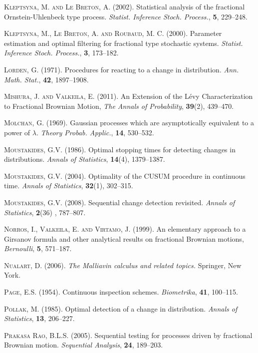 \documentclass[11pt,reqno]{amsart}
\theoremstyle{remark}
\begin{document}
\begin{thebibliography}{99}
 \textsc{Kleptsyna, M. and Le Breton, A.} (2002). Statistical analysis of the fractional Ornstein-Uhlenbeck type process. {\em Statist. Inference Stoch. Process.}, \textbf{5}, 229--248.

 \textsc{Kleptsyna, M., Le Breton, A. and Roubaud, M. C.} (2000). Parameter estimation and optimal filtering for fractional type stochastic systems. {\em Statist. Inference Stoch. Process.}, \textbf{3}, 173--182.

  \textsc{Lorden, G.} (1971). Procedures for reacting to a change in distribution. {\em Ann. Math. Stat.}, \textbf{42}, 1897--1908.

 \textsc{Mishura, J. and Valkeila, E.} (2011). An Extension of the L\'evy Characterization to Fractional Brownian Motion,
\emph{The Annals of Probability}, \textbf{39}(2), 439--470.

 \textsc{Molchan, G.} (1969). Gaussian processes which are asymptotically equivalent to a power of $\lambda$. {\em Theory Probab. Applic.}, \textbf{14}, 530--532.

 \textsc{Moustakides, G.V.} (1986). Optimal stopping times for detecting changes in distributions. {\em Annals of Statistics}, \textbf{14}(4), 1379--1387.

 \textsc{Moustakides, G.V.} (2004). Optimality of the CUSUM  procedure in continuous time. {\em  Annals of Statistics}, \textbf{32}(1), 302--315.

 \textsc{Moustakides, G.V.} (2008). Sequential change detection revisited. {\em Annals of Statistics}, \textbf{2}(36) , 787--807.

 \textsc{Norros, I., Valkeila, E. and Virtamo, J.} (1999). An elementary approach to a Girsanov formula and other analytical results on fractional Brownian motions, \textit{Bernoulli}, \textbf{5}, 571--187.

 \textsc{Nualart, D. }(2006). {\em The Malliavin calculus and related topics.} Springer, New York.

  \textsc{Page, E.S.} (1954). Continuous inspection schemes. {\em Biometrika}, \textbf{41}, 100--115.

 \textsc{Pollak, M.} (1985). Optimal detection of a change in distribution. {\em Annals of Statistics}, \textbf{13}, 206--227.

 \textsc{Prakasa Rao, B.L.S.} (2005). Sequential testing for processes driven by fractional Brownian motion. {\em Sequential Analysis}, \textbf{24}, 189--203.


\end{thebibliography}
\end{document}
